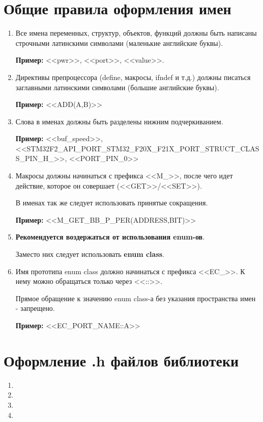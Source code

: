 \section{Общие правила оформления имен}
\label{general:rules:0}
\begin{enumerate}
	\item Все имена переменных, структур, объектов, функций должны быть написаны строчными латинскими символами (маленькие английские буквы).
	
	\textbf{Пример: }<<pwr>>, <<port>>, <<value>>.
	\item Директивы препроцессора (define, макросы, ifndef и т.д.) должны писаться заглавными латинскими символами (большие английские буквы). 
	
	\textbf{Пример: }<<ADD(A,B)>>
	\item Слова в именах должны быть разделены нижним подчеркиванием.
	
	\textbf{Пример: }<<buf\_speed>>, <<STM32F2\_\-API\_\-PORT\_\-STM32\_\-F20X\_\-F21X\_\-PORT\_\-STRUCT\_\-CLASS\_\-PIN\_\-H\_>>, <<PORT\_PIN\_0>>
	\item Макросы должны начинаться с префикса <<M\_>>, после чего идет действие, которое он совершает (<<GET>>/<<SET>>).
	
	В именах так же следует использовать принятые сокращения.
	
	\textbf{Пример: }<<M\_GET\_BB\_P\_PER(ADDRESS,BIT)>>
	\item \textbf{Рекомендуется воздержаться от использования enum-ов}.
	
	Заместо них следует использовать \textbf{enum class}.
	\item Имя прототипа enum class должно начинаться с префикса <<EC\_>>. К нему можно обращаться только через <<::>>.
	
	Прямое обращение к значению enum class-а без указания пространства имен - запрещено.
	
	\textbf{Пример: }<<EC\_PORT\_NAME::A>>
\end{enumerate}

\section{Оформление .h файлов библиотеки}
\label{file:h}
\begin{enumerate}
	\item
	\item
	\item
	\item
\end{enumerate}
